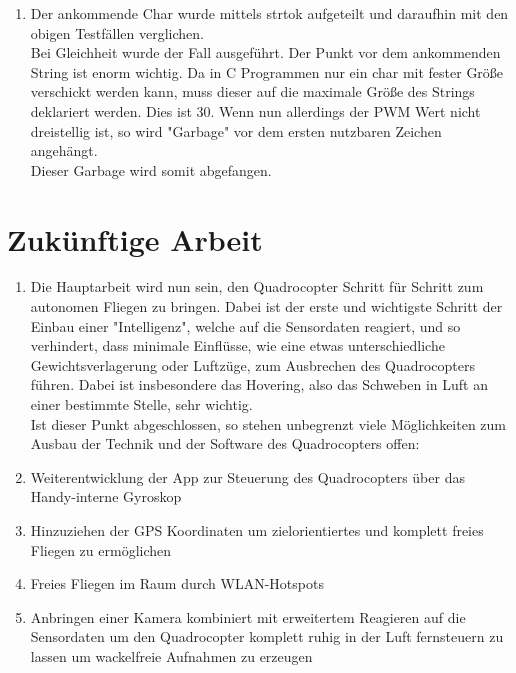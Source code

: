 \documentclass{article}
\begin{document}
\begin{enumerate}
\begin{verbatim}
\end{verbatim}

\item[] Der ankommende Char wurde mittels strtok aufgeteilt und daraufhin mit den obigen Testfällen verglichen.\\
Bei Gleichheit wurde der Fall ausgeführt.
Der Punkt vor dem ankommenden String ist enorm wichtig.
Da in C Programmen nur ein char mit fester Größe verschickt werden kann, muss dieser auf die maximale Größe des Strings deklariert werden. Dies ist 30. Wenn nun allerdings der PWM Wert nicht dreistellig ist, so wird "Garbage" vor dem ersten nutzbaren Zeichen angehängt.\\
Dieser Garbage wird somit abgefangen.

\end{enumerate}




\section{Zukünftige Arbeit}
\begin{enumerate}
\item[] Die Hauptarbeit wird nun sein, den Quadrocopter Schritt für Schritt zum autonomen Fliegen zu bringen. Dabei ist der erste und wichtigste Schritt der Einbau einer "Intelligenz", welche auf die Sensordaten reagiert, und so verhindert, dass minimale Einflüsse, wie eine etwas unterschiedliche Gewichtsverlagerung oder Luftzüge, zum Ausbrechen des Quadrocopters führen. Dabei ist insbesondere das Hovering, also das Schweben in Luft an einer bestimmte Stelle, sehr wichtig.\\
Ist dieser Punkt abgeschlossen, so stehen unbegrenzt viele Möglichkeiten zum Ausbau der Technik und der Software des Quadrocopters offen:\\
\item Weiterentwicklung der App zur Steuerung des Quadrocopters über das Handy-interne Gyroskop\\
\item Hinzuziehen der GPS Koordinaten um zielorientiertes und komplett freies Fliegen zu ermöglichen\\
\item Freies Fliegen im Raum durch WLAN-Hotspots\\
\item Anbringen einer Kamera kombiniert mit erweitertem Reagieren auf die Sensordaten um den Quadrocopter komplett ruhig in der Luft fernsteuern zu lassen um wackelfreie Aufnahmen zu erzeugen\\


\end{enumerate}
\end{document}
